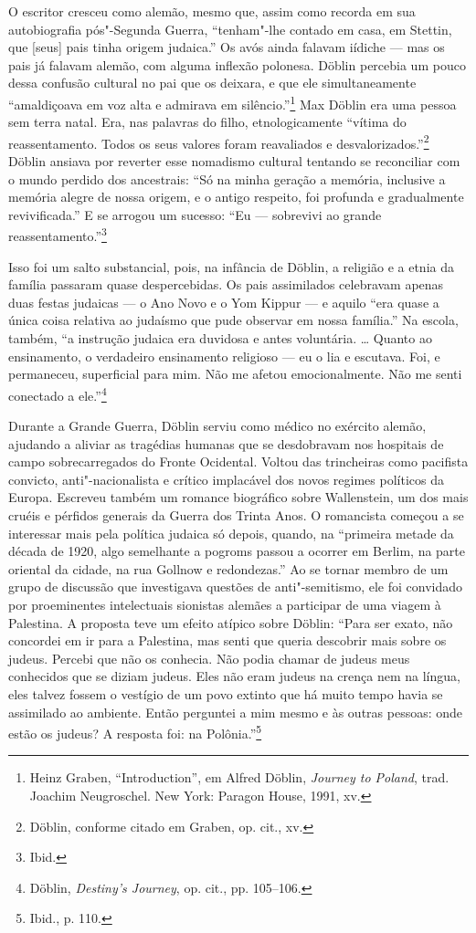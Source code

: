 O escritor cresceu como alemão, mesmo que, assim como recorda em sua
autobiografia pós"-Segunda Guerra, ``tenham"-lhe contado em casa, em
Stettin, que {[}seus{]} pais tinha origem judaica.'' Os avós ainda
falavam iídiche --- mas os pais já falavam alemão, com alguma inflexão
polonesa. Döblin percebia um pouco dessa confusão cultural no pai que os
deixara, e que ele simultaneamente ``amaldiçoava em voz alta e admirava
em silêncio.''\footnote{Heinz Graben, ``Introduction'', em Alfred
  Döblin, \emph{Journey to Poland}, trad. Joachim Neugroschel. New York:
  Paragon House, 1991, xv.} Max Döblin era uma pessoa sem terra natal.
Era, nas palavras do filho, etnologicamente ``vítima do reassentamento.
Todos os seus valores foram reavaliados e desvalorizados.''\footnote{Döblin,
  conforme citado em Graben, op. cit., xv.} Döblin ansiava por reverter
esse nomadismo cultural tentando se reconciliar com o mundo perdido dos
ancestrais: ``Só na minha geração a memória, inclusive a memória alegre
de nossa origem, e o antigo respeito, foi profunda e gradualmente
revivificada.'' E se arrogou um sucesso: ``Eu --- sobrevivi ao grande
reassentamento.''\footnote{Ibid.}

Isso foi um salto substancial, pois, na infância de Döblin, a religião e
a etnia da família passaram quase despercebidas. Os pais assimilados
celebravam apenas duas festas judaicas --- o Ano Novo e o Yom Kippur --- e
aquilo ``era quase a única coisa relativa ao judaísmo que pude observar
em nossa família.'' Na escola, também, ``a instrução judaica era
duvidosa e antes voluntária. \ldots{} Quanto ao ensinamento, o
verdadeiro ensinamento religioso --- eu o lia e escutava. Foi, e
permaneceu, superficial para mim. Não me afetou emocionalmente. Não me
senti conectado a ele.''\footnote{Döblin, \emph{Destiny's Journey}, op.
  cit., pp. 105--106.}

Durante a Grande Guerra, Döblin serviu como médico no exército alemão,
ajudando a aliviar as tragédias humanas que se desdobravam nos hospitais
de campo sobrecarregados do Fronte Ocidental. Voltou das trincheiras
como pacifista convicto, anti"-nacionalista e crítico implacável dos
novos regimes políticos da Europa. Escreveu também um romance biográfico
sobre Wallenstein, um dos mais cruéis e pérfidos generais da Guerra dos
Trinta Anos. O romancista começou a se interessar mais pela política
judaica só depois, quando, na ``primeira metade da década de 1920, algo
semelhante a pogroms passou a ocorrer em Berlim, na parte oriental da
cidade, na rua Gollnow e redondezas.'' Ao se tornar membro de um grupo
de discussão que investigava questões de anti"-semitismo, ele foi
convidado por proeminentes intelectuais sionistas alemães a participar
de uma viagem à Palestina. A proposta teve um efeito atípico sobre
Döblin: ``Para ser exato, não concordei em ir para a Palestina, mas
senti que queria descobrir mais sobre os judeus. Percebi que não os
conhecia. Não podia chamar de judeus meus conhecidos que se diziam
judeus. Eles não eram judeus na crença nem na língua, eles talvez fossem
o vestígio de um povo extinto que há muito tempo havia se assimilado ao
ambiente. Então perguntei a mim mesmo e às outras pessoas: onde estão os
judeus? A resposta foi: na Polônia.''\footnote{Ibid., p. 110.}


